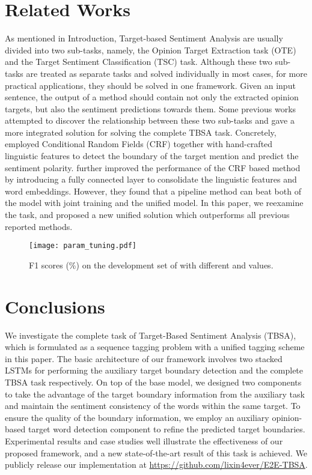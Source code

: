 \documentclass[letterpaper]{article} \usepackage{aaai19}  \usepackage{times}  \usepackage{helvet}  \usepackage{courier}  \usepackage{url}  \usepackage{graphicx}  \frenchspacing  \setlength{\pdfpagewidth}{8.5in}  \setlength{\pdfpageheight}{11in}
\begin{document}
\section{Related Works}
As mentioned in Introduction, Target-based Sentiment Analysis are usually divided into two sub-tasks, namely, the Opinion Target Extraction task (OTE) and the Target Sentiment Classification (TSC) task. Although these two sub-tasks are treated as separate tasks and solved individually in most cases, for more practical applications, they should be solved in one framework. Given an input sentence, the output of a method should contain not only the extracted opinion targets, but also the sentiment predictions towards them. Some previous works attempted to discover the relationship between these two sub-tasks and gave a more integrated solution for solving the complete TBSA task. Concretely, \cite{D13-1171} employed Conditional Random Fields (CRF) together with hand-crafted linguistic features to detect the boundary of the target mention and predict the sentiment polarity. \cite{D15-1073} further improved the performance of the CRF based method by introducing a fully connected layer to consolidate the linguistic features and word embeddings. However, they found that a pipeline method can beat both of the model with joint training and the unified model. In this paper, we reexamine the task, and proposed a new unified solution which outperforms all previous reported methods. 

\begin{figure}[t]
    \centering
    \texttt{[image: param\_tuning.pdf]}
    \caption{F1 scores (\%) on the development set of  with different  and  values.}
    \label{fig:tunning}
\end{figure}

\section{Conclusions}
We investigate the complete task of Target-Based Sentiment Analysis (TBSA), which is formulated as a sequence tagging problem with a unified tagging scheme in this paper. The basic architecture of our framework involves two stacked LSTMs for performing the auxiliary target boundary detection and the complete TBSA task respectively. On top of the base model, we designed two components to take the advantage of the target boundary information from the auxiliary task and maintain the sentiment consistency of the words within the same target. To ensure the quality of the boundary information, we employ an auxiliary opinion-based target word detection component to refine the predicted target boundaries. Experimental results and case studies well illustrate the effectiveness of our proposed framework, and a new state-of-the-art result of this task is achieved. We publicly release our implementation at \url{https://github.com/lixin4ever/E2E-TBSA}.



\end{document}
